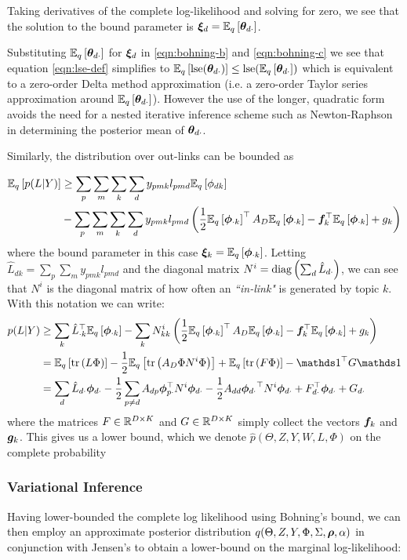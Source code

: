 Taking derivatives of the complete log-likelihood and solving for zero, we see that the solution to the bound parameter is $\Ed = \ex{\thdo}{q}$. 

Substituting $\ex{\thdo}{q}$ for $\Ed$ in \eqref{eqn:bohning-b} and \eqref{eqn:bohning-c} we see that equation \eqref{eqn:lse-def} simplifies to $\ex{\lse(\thdo)}{q} \leq \lse(\ex{\thdo}{q})$ which is equivalent to a zero-order Delta method approximation (i.e. a zero-order Taylor series approximation around $\ex{\thdo}{q}$). However the use of the longer, quadratic form avoids the need for a nested iterative inference scheme such as Newton-Raphson in determining the posterior mean of $\thdo$.

Similarly, the distribution over out-links can be bounded as

\begin{align}
\ex{p(L|Y)}{q} & \geq \sum_p \sum_m \sum_k \sum_d y_{pmk} l_{pmd} \ex{\phi_{dk}}{q} \\
 & - \sum_p \sum_m \sum_k \sum_d y_{pmk} l_{pmd} \left(\half \ex{\phok}{q}\T A_D \ex{\phok}{q} - \vv{f}_k\T \ex{\phok}{q} + g_k\right)
\end{align}
where the bound parameter in this case $\vv{\xi}_k = \ex{\phok}{q}$. Letting $\hat{L}_{dk} = \sum_p \sum_m y_{pmk} l_{pmd}$ and the diagonal matrix $N^i = \diag{\sum_d \hat{L}_{d\cdot}}$, we can see that $N^i$ is the diagonal matrix of how often an \emph{``in-link"} is generated by topic $k$. With this notation we can write:
\begin{align}
p(L|Y) & \geq \sum_k \hat{L}_{\cdot k}\T \ex{\phok}{q} - \sum_k N^i_{kk} \left(\half \ex{\phok}{q}\T A_D \ex{\phok}{q} - \vv{f}_k\T \ex{\phok}{q} + g_k\right) \\
& = \ex{\Tr{L \Phi}}{q} - \half \ex{\Tr{A_D \Phi N^i \Phi}}{q} + \ex{\Tr{F \Phi}}{q} - \one\T G \one \\
& = \sum_d \hat{L}_{d\cdot} \phdo - \half \sum_{p \neq d} A_{dp} \vv{\phi}_{p\cdot}\T N^i \phdo -\half A_{dd} \phdo\T N^i \phdo + F_{d\cdot}\T\phdo + G_{d\cdot}
\end{align}
where the matrices $F \in \MReal{D}{K}$ and $G \in \MReal{D}{K}$ simply collect the vectors $\vv{f}_k$ and $\vv{g}_k$. This gives us a lower bound, which we denote $\hat{p}(\Theta, Z, Y, W, L, \Phi)$  on the complete probability


\subsubsection*{Variational Inference}
Having lower-bounded the complete log likelihood using Bohning's bound, we can then employ an approximate posterior distribution $q(\Theta, Z, Y, \Phi, \Sigma, \vv{\rho}, \alpha)$ in conjunction with Jensen's to obtain a lower-bound on the marginal log-likelihood:

